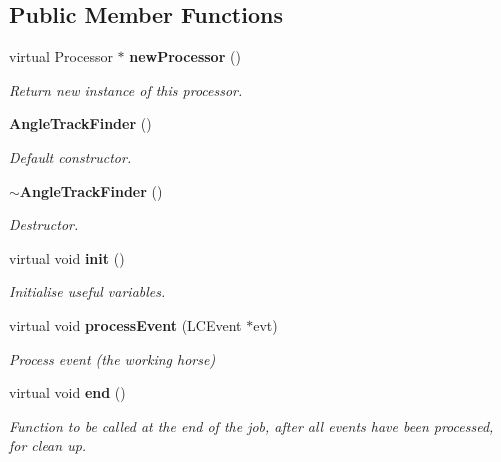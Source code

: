 \subsection*{Public Member Functions}
\begin{DoxyCompactItemize}
\item 
virtual Processor $\ast$ {\bf new\-Processor} ()\label{classCALICE_1_1AngleTrackFinder_af929a19d0689fbf8f946988797daff4a}

\begin{DoxyCompactList}\small\item\em Return new instance of this processor. \end{DoxyCompactList}\item 
{\bf Angle\-Track\-Finder} ()\label{classCALICE_1_1AngleTrackFinder_a74cdcf69ca7ef1072ccdd5ea7d9ae551}

\begin{DoxyCompactList}\small\item\em Default constructor. \end{DoxyCompactList}\item 
{\bf $\sim$\-Angle\-Track\-Finder} ()\label{classCALICE_1_1AngleTrackFinder_acf657623bf1eff4c45b4af704f519ca3}

\begin{DoxyCompactList}\small\item\em Destructor. \end{DoxyCompactList}\item 
virtual void {\bf init} ()\label{classCALICE_1_1AngleTrackFinder_a994a129403fc067c93e4a37545c79499}

\begin{DoxyCompactList}\small\item\em Initialise useful variables. \end{DoxyCompactList}\item 
virtual void {\bf process\-Event} (L\-C\-Event $\ast$evt)
\begin{DoxyCompactList}\small\item\em Process event (the working horse) \end{DoxyCompactList}\item 
virtual void {\bf end} ()\label{classCALICE_1_1AngleTrackFinder_a4e7d844d0f42764d16f9f66a3f887f4c}

\begin{DoxyCompactList}\small\item\em Function to be called at the end of the job, after all events have been processed, for clean up. \end{DoxyCompactList}\end{DoxyCompactItemize}
